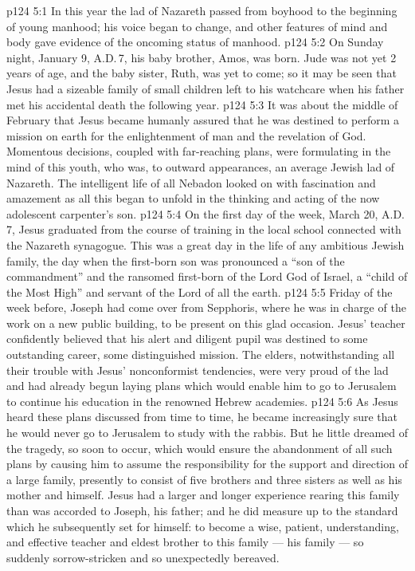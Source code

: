 \vs p124 5:1 In this year the lad of Nazareth passed from boyhood to the beginning of young manhood; his voice began to change, and other features of mind and body gave evidence of the oncoming status of manhood.
\vs p124 5:2 On Sunday night, January 9, A.D.\,7, his baby brother, Amos, was born. Jude was not yet 2 years of age, and the baby sister, Ruth, was yet to come; so it may be seen that Jesus had a sizeable family of small children left to his watchcare when his father met his accidental death the following year.
\vs p124 5:3 \pc It was about the middle of February that Jesus became humanly assured that he was destined to perform a mission on earth for the enlightenment of man and the revelation of God. Momentous decisions, coupled with far\hyp{}reaching plans, were formulating in the mind of this youth, who was, to outward appearances, an average Jewish lad of Nazareth. The intelligent life of all Nebadon looked on with fascination and amazement as all this began to unfold in the thinking and acting of the now adolescent carpenter’s son.
\vs p124 5:4 \pc On the first day of the week, March 20, A.D.\,7, Jesus graduated from the course of training in the local school connected with the Nazareth synagogue. This was a great day in the life of any ambitious Jewish family, the day when the first\hyp{}born son was pronounced a “son of the commandment” and the ransomed first\hyp{}born of the Lord God of Israel, a “child of the Most High” and servant of the Lord of all the earth.
\vs p124 5:5 Friday of the week before, Joseph had come over from Sepphoris, where he was in charge of the work on a new public building, to be present on this glad occasion. Jesus’ teacher confidently believed that his alert and diligent pupil was destined to some outstanding career, some distinguished mission. The elders, notwithstanding all their trouble with Jesus’ nonconformist tendencies, were very proud of the lad and had already begun laying plans which would enable him to go to Jerusalem to continue his education in the renowned Hebrew academies.
\vs p124 5:6 As Jesus heard these plans discussed from time to time, he became increasingly sure that he would never go to Jerusalem to study with the rabbis. But he little dreamed of the tragedy, so soon to occur, which would ensure the abandonment of all such plans by causing him to assume the responsibility for the support and direction of a large family, presently to consist of five brothers and three sisters as well as his mother and himself. Jesus had a larger and longer experience rearing this family than was accorded to Joseph, his father; and he did measure up to the standard which he subsequently set for himself: to become a wise, patient, understanding, and effective teacher and eldest brother to this family --- his family --- so suddenly sorrow\hyp{}stricken and so unexpectedly bereaved.
